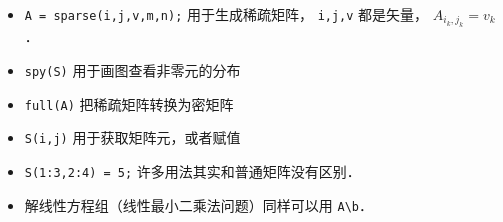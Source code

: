 
\begin{issues}
\issueDraft
\end{issues}

\begin{itemize}
\item \verb|A = sparse(i,j,v,m,n);| 用于生成稀疏矩阵， \verb|i,j,v| 都是矢量， $A_{i_k,j_k} = v_k$．
\item \verb|spy(S)| 用于画图查看非零元的分布
\item \verb|full(A)| 把稀疏矩阵转换为密矩阵
\item \verb|S(i,j)| 用于获取矩阵元，或者赋值
\item \verb|S(1:3,2:4) = 5;| 许多用法其实和普通矩阵没有区别．
\item 解线性方程组（线性最小二乘法问题）同样可以用 \verb|A\b|．
\end{itemize}
